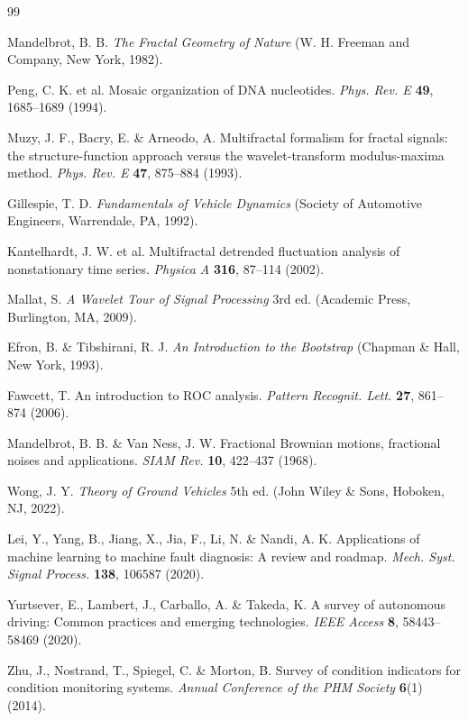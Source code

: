 \documentclass[11pt]{article}
\begin{document}
\begin{thebibliography}{99}

Mandelbrot, B. B. \textit{The Fractal Geometry of Nature} (W. H. Freeman and Company, New York, 1982).

Peng, C. K. et al. Mosaic organization of DNA nucleotides. \textit{Phys. Rev. E} \textbf{49}, 1685--1689 (1994).

Muzy, J. F., Bacry, E. \& Arneodo, A. Multifractal formalism for fractal signals: the structure-function approach versus the wavelet-transform modulus-maxima method. \textit{Phys. Rev. E} \textbf{47}, 875--884 (1993).

Gillespie, T. D. \textit{Fundamentals of Vehicle Dynamics} (Society of Automotive Engineers, Warrendale, PA, 1992).

Kantelhardt, J. W. et al. Multifractal detrended fluctuation analysis of nonstationary time series. \textit{Physica A} \textbf{316}, 87--114 (2002).

Mallat, S. \textit{A Wavelet Tour of Signal Processing} 3rd ed. (Academic Press, Burlington, MA, 2009).

Efron, B. \& Tibshirani, R. J. \textit{An Introduction to the Bootstrap} (Chapman \& Hall, New York, 1993).

Fawcett, T. An introduction to ROC analysis. \textit{Pattern Recognit. Lett.} \textbf{27}, 861--874 (2006).

Mandelbrot, B. B. \& Van Ness, J. W. Fractional Brownian motions, fractional noises and applications. \textit{SIAM Rev.} \textbf{10}, 422--437 (1968).

Wong, J. Y. \textit{Theory of Ground Vehicles} 5th ed. (John Wiley \& Sons, Hoboken, NJ, 2022).

Lei, Y., Yang, B., Jiang, X., Jia, F., Li, N. \& Nandi, A. K. Applications of machine learning to machine fault diagnosis: A review and roadmap. \textit{Mech. Syst. Signal Process.} \textbf{138}, 106587 (2020).

Yurtsever, E., Lambert, J., Carballo, A. \& Takeda, K. A survey of autonomous driving: Common practices and emerging technologies. \textit{IEEE Access} \textbf{8}, 58443--58469 (2020).

Zhu, J., Nostrand, T., Spiegel, C. \& Morton, B. Survey of condition indicators for condition monitoring systems. \textit{Annual Conference of the PHM Society} \textbf{6}(1) (2014).


\end{thebibliography}
\end{document}
